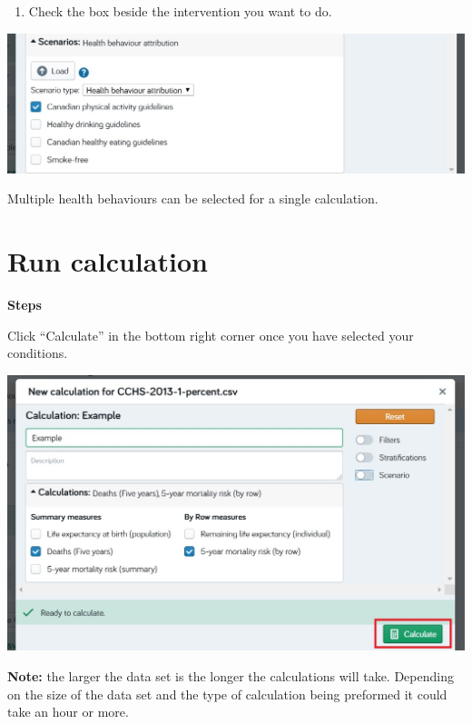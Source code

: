 \documentclass[]{book}
\providecommand{\tightlist}{%
  \setlength{\itemsep}{0pt}\setlength{\parskip}{0pt}}
\begin{document}
\begin{enumerate}
\def\labelenumi{\arabic{enumi}.}
\setcounter{enumi}{2}
\tightlist
\item
  Check the box beside the intervention you want to do.
\end{enumerate}

\begin{center}\includegraphics{Images/Scenario-HBattribution2} \end{center}

Multiple health behaviours can be selected for a single calculation.

\section{Run calculation}\label{run-calculation}

\textbf{Steps}

Click ``Calculate'' in the bottom right corner once you have selected
your conditions.

\begin{center}\includegraphics{Images/Calculate} \end{center}

\textbf{Note:} the larger the data set is the longer the calculations
will take. Depending on the size of the data set and the type of
calculation being preformed it could take an hour or more.
\end{document}
